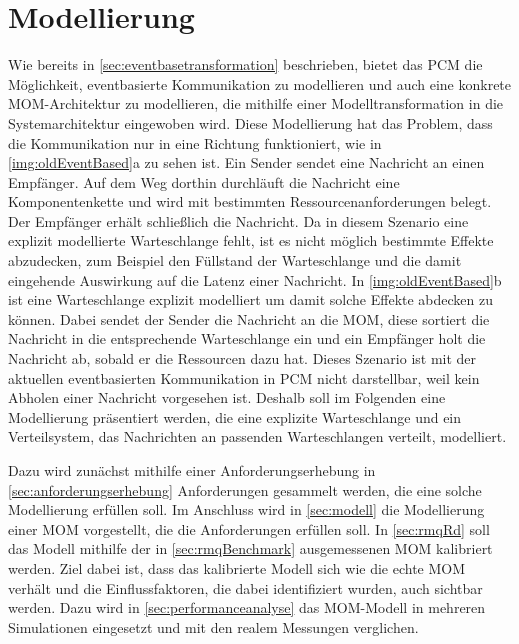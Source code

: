 
\chapter{Modellierung}
\label{ch:modellierung}
Wie bereits in \autoref{sec:eventbasetransformation} beschrieben, bietet das PCM die Möglichkeit, eventbasierte Kommunikation zu modellieren und auch eine konkrete MOM-Architektur zu modellieren, die mithilfe einer Modelltransformation in die Systemarchitektur eingewoben wird. Diese Modellierung hat das Problem, dass die Kommunikation nur in eine Richtung funktioniert, wie in \autoref{img:oldEventBased}a zu sehen ist. Ein Sender sendet eine Nachricht an einen Empfänger. Auf dem Weg dorthin durchläuft die Nachricht eine Komponentenkette und wird mit bestimmten Ressourcenanforderungen belegt. Der Empfänger erhält schließlich die Nachricht. Da in diesem Szenario eine explizit modellierte Warteschlange fehlt, ist es nicht möglich bestimmte Effekte abzudecken, zum Beispiel den Füllstand der Warteschlange und die damit eingehende Auswirkung auf die Latenz einer Nachricht. In \autoref{img:oldEventBased}b ist eine Warteschlange explizit modelliert um damit solche Effekte abdecken zu können. Dabei sendet der Sender die Nachricht an die MOM, diese sortiert die Nachricht in die entsprechende Warteschlange ein und ein Empfänger holt die Nachricht ab, sobald er die Ressourcen dazu hat. Dieses Szenario ist mit der aktuellen eventbasierten Kommunikation in PCM nicht darstellbar, weil kein Abholen einer Nachricht vorgesehen ist. Deshalb soll im Folgenden eine Modellierung präsentiert werden, die eine explizite Warteschlange und ein Verteilsystem, das Nachrichten an passenden Warteschlangen verteilt, modelliert.\par
Dazu wird zunächst mithilfe einer Anforderungserhebung in \autoref{sec:anforderungserhebung} Anforderungen gesammelt werden, die eine solche Modellierung erfüllen soll. Im Anschluss wird in \autoref{sec:modell} die Modellierung einer MOM vorgestellt, die die Anforderungen erfüllen soll. In \autoref{sec:rmqRd} soll das Modell mithilfe der in \autoref{sec:rmqBenchmark} ausgemessenen MOM kalibriert werden. Ziel dabei ist, dass das kalibrierte Modell sich wie die echte MOM verhält und die Einflussfaktoren, die dabei identifiziert wurden, auch sichtbar werden. Dazu wird in \autoref{sec:performanceanalyse} das MOM-Modell in mehreren Simulationen eingesetzt und mit den realem Messungen verglichen. 

